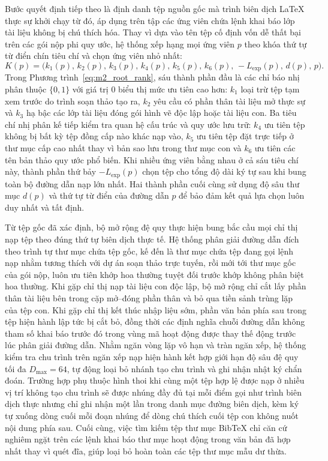 Bước quyết định tiếp theo là định danh tệp nguồn gốc mà trình biên dịch LaTeX thực sự khởi chạy từ đó, áp dụng trên tập các ứng viên chứa lệnh khai báo lớp tài liệu không bị chú thích hóa. Thay vì dựa vào tên tệp cố định vốn dễ thất bại trên các gói nộp phi quy ước, hệ thống xếp hạng mọi ứng viên $p$ theo khóa thứ tự từ điển chín tiêu chí và chọn ứng viên nhỏ nhất:
\begin{equation}
    K(p) = \bigl(k_1(p),\, k_2(p),\, k_3(p),\, k_4(p),\, k_5(p),\, k_6(p),\, -L_{\text{exp}}(p),\, d(p),\, p\bigr).
    \label{eq:m2_root_rank}
\end{equation}
Trong Phương trình~\eqref{eq:m2_root_rank}, sáu thành phần đầu là các chỉ báo nhị phân thuộc $\{0, 1\}$ với giá trị $0$ biểu thị mức ưu tiên cao hơn: $k_1$ loại trừ tệp tạm xem trước do trình soạn thảo tạo ra, $k_2$ yêu cầu có phần thân tài liệu mở thực sự và $k_3$ hạ bậc các lớp tài liệu đóng gói hình vẽ độc lập hoặc tài liệu con. Ba tiêu chí nhị phân kế tiếp kiểm tra quan hệ cấu trúc và quy ước lưu trữ: $k_4$ ưu tiên tệp không bị bất kỳ tệp đồng cấp nào khác nạp vào, $k_5$ ưu tiên tệp đặt trực tiếp ở thư mục cấp cao nhất thay vì bản sao lưu trong thư mục con và $k_6$ ưu tiên các tên bản thảo quy ước phổ biến. Khi nhiều ứng viên bằng nhau ở cả sáu tiêu chí này, thành phần thứ bảy $-L_{\text{exp}}(p)$ chọn tệp cho tổng độ dài ký tự sau khi bung toàn bộ đường dẫn nạp lớn nhất. Hai thành phần cuối cùng sử dụng độ sâu thư mục $d(p)$ và thứ tự từ điển của đường dẫn $p$ để bảo đảm kết quả lựa chọn luôn duy nhất và tất định.

Từ tệp gốc đã xác định, bộ mở rộng đệ quy thực hiện bung bắc cầu mọi chỉ thị nạp tệp theo đúng thứ tự biên dịch thực tế. Hệ thống phân giải đường dẫn đích theo trình tự thư mục chứa tệp gốc, kế đến là thư mục chứa tệp đang gọi lệnh nạp nhằm tương thích với dự án soạn thảo trực tuyến, rồi mới tới thư mục gốc của gói nộp, luôn ưu tiên khớp hoa thường tuyệt đối trước khớp không phân biệt hoa thường. Khi gặp chỉ thị nạp tài liệu con độc lập, bộ mở rộng chỉ cắt lấy phần thân tài liệu bên trong cặp mở--đóng phần thân và bỏ qua tiền sảnh trùng lặp của tệp con. Khi gặp chỉ thị kết thúc nhập liệu sớm, phần văn bản phía sau trong tệp hiện hành lập tức bị cắt bỏ, đồng thời các định nghĩa chuỗi đường dẫn không tham số khai báo trước đó trong vùng mã hoạt động được thay thế động trước lúc phân giải đường dẫn. Nhằm ngăn vòng lặp vô hạn và tràn ngăn xếp, hệ thống kiểm tra chu trình trên ngăn xếp nạp hiện hành kết hợp giới hạn độ sâu đệ quy tối đa $D_{\max} = 64$, tự động loại bỏ nhánh tạo chu trình và ghi nhận nhật ký chẩn đoán. Trường hợp phụ thuộc hình thoi khi cùng một tệp hợp lệ được nạp ở nhiều vị trí không tạo chu trình sẽ được nhúng đầy đủ tại mỗi điểm gọi như trình biên dịch thực nhưng chỉ ghi nhận một lần trong danh mục đường biên dịch, kèm ký tự xuống dòng cuối mỗi đoạn nhúng để dòng chú thích cuối tệp con không nuốt nội dung phía sau. Cuối cùng, việc tìm kiếm tệp thư mục BibTeX chỉ căn cứ nghiêm ngặt trên các lệnh khai báo thư mục hoạt động trong văn bản đã hợp nhất thay vì quét đĩa, giúp loại bỏ hoàn toàn các tệp thư mục mẫu dư thừa.

